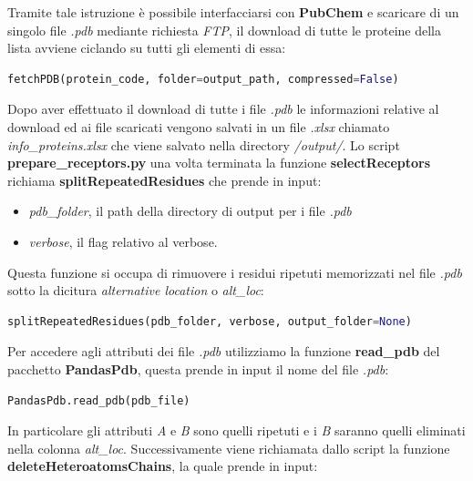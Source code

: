 Tramite tale istruzione è possibile interfacciarsi con \textbf{PubChem} e scaricare di un singolo file \textit{.pdb} mediante richiesta \textit{FTP}, il download di tutte le proteine della lista avviene ciclando su tutti gli elementi di essa:

\begin{lstlisting}[language=Python, label=lst:code18, caption={funzione fetchPDB}]
fetchPDB(protein_code, folder=output_path, compressed=False)
\end{lstlisting}

Dopo aver effettuato il download di tutte i file \textit{.pdb} le informazioni relative al download ed ai file scaricati vengono salvati in un file \textit{.xlsx} chiamato \textit{info\_proteins.xlsx} che viene salvato nella directory \textit{/output/}.\newline
Lo script \textbf{prepare\_receptors.py} una volta terminata la funzione \textbf{selectReceptors} richiama \textbf{splitRepeatedResidues} che prende in input:

\begin{itemize}
    \item \textit{pdb\_folder}, il path della directory di output per i file \textit{.pdb}
    \item \textit{verbose}, il flag relativo al verbose.
\end{itemize}

Questa funzione si occupa di rimuovere i residui ripetuti memorizzati nel file \textit{.pdb} sotto la dicitura \textit{alternative location} o \textit{alt\_loc}:

\begin{lstlisting}[language=Python, label=lst:code19, caption={funzione splitRepeatedResidues}]
splitRepeatedResidues(pdb_folder, verbose, output_folder=None)    
\end{lstlisting}

Per accedere agli attributi dei file \textit{.pdb} utilizziamo la funzione \textbf{read\_pdb} del pacchetto \textbf{PandasPdb}, questa prende in input il nome del file \textit{.pdb}:

\begin{lstlisting}[language=Python, label=lst:code20, caption={funzione PandasPdb.read\_pdb}]
PandasPdb.read_pdb(pdb_file)
\end{lstlisting}

In particolare gli attributi \textit{A} e \textit{B} sono quelli ripetuti e i \textit{B} saranno quelli eliminati nella colonna \textit{alt\_loc}.\newline
Successivamente viene richiamata dallo script la funzione \textbf{deleteHeteroatomsChains}, la quale prende in input:

